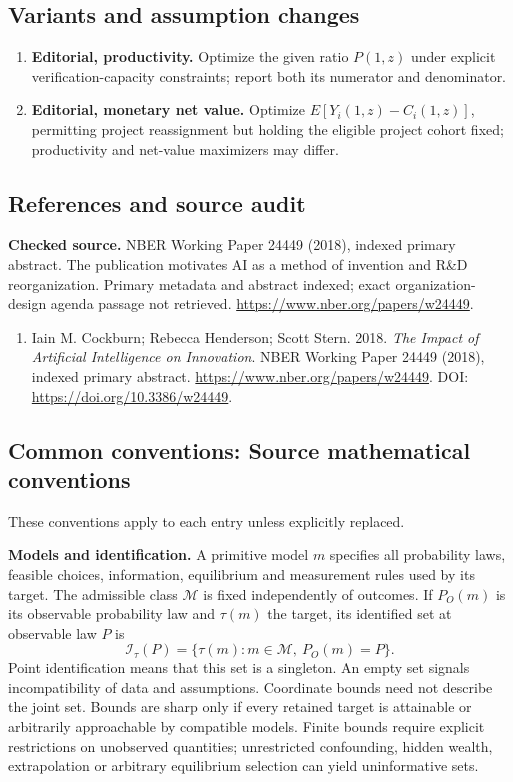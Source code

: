 \documentclass[11pt,a4paper]{article}
\begin{document}
\subsection*{Variants and assumption changes}
\begin{enumerate}
\item \textbf{Editorial, productivity.} Optimize the given ratio \(P(1,z)\) under explicit verification-capacity constraints; report both its numerator and denominator.
\item \textbf{Editorial, monetary net value.} Optimize \(E[Y_i(1,z)-C_i(1,z)]\), permitting project reassignment but holding the eligible project cohort fixed; productivity and net-value maximizers may differ.
\end{enumerate}
\subsection*{References and source audit}
\textbf{Checked source.} NBER Working Paper 24449 (2018), indexed primary abstract. The publication motivates AI as a method of invention and R\&D reorganization. Primary metadata and abstract indexed; exact organization-design agenda passage not retrieved. \url{https://www.nber.org/papers/w24449}.
\begin{enumerate}\raggedright
\item\hypertarget{definitions:source:30007696:1}{} Iain M. Cockburn; Rebecca Henderson; Scott Stern. 2018. \emph{The Impact of Artificial Intelligence on Innovation}. NBER Working Paper 24449 (2018), indexed primary abstract.
\url{https://www.nber.org/papers/w24449}.
DOI: \url{https://doi.org/10.3386/w24449}.
\end{enumerate}

\subsection*{Common conventions: Source mathematical conventions}

These conventions apply to each entry unless explicitly replaced.

\textbf{Models and identification.} A primitive model \(m\) specifies all probability laws, feasible choices, information, equilibrium and measurement rules used by its target. The admissible class \(\mathcal M\) is fixed independently of outcomes. If \(P_O(m)\) is its observable probability law and \(\tau(m)\) the target, its identified set at observable law \(P\) is
\[
 \mathcal I_\tau(P)=\{\tau(m):m\in\mathcal M,\ P_O(m)=P\}.
\]
Point identification means that this set is a singleton. An empty set signals incompatibility of data and assumptions. Coordinate bounds need not describe the joint set. Bounds are sharp only if every retained target is attainable or arbitrarily approachable by compatible models. Finite bounds require explicit restrictions on unobserved quantities; unrestricted confounding, hidden wealth, extrapolation or arbitrary equilibrium selection can yield uninformative sets.
\end{document}
